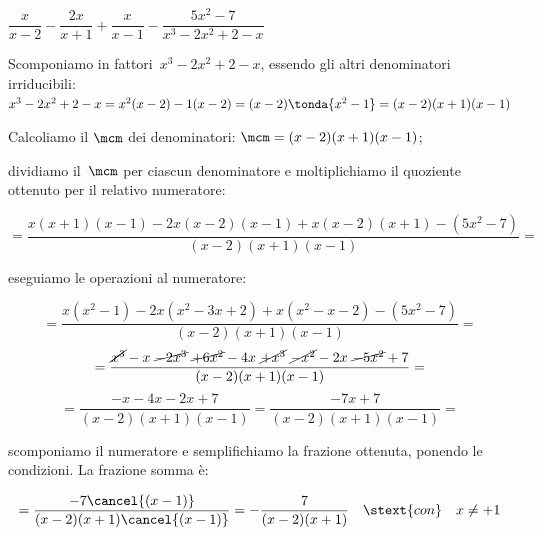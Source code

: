 
\begin{esempio}{}{}
\(\dfrac{x}{x-2}-\dfrac{2x}{x+1}+
\dfrac{x}{x-1}-\dfrac{5x^{2}-7}{x^{3}-2x^{2}+2-x}\)\\

\begin{enumeratea}
\item Scomponiamo in fattori~\(x^{3}-2x^{2}+2-x\), 
essendo gli altri denominatori irriducibili: 
\(x^{3}-2x^{2}+2-x=x^2(x-2)-1(x-2)=(x-2) \tonda{x^2-1} =
  (x-2)(x+1)(x-1)\)%

\item Calcoliamo il \(\mcm\) dei denominatori: 
\(\mcm=(x-2)(x+1)(x-1)\);

\item dividiamo il~\(\mcm\) per ciascun denominatore e moltiplichiamo il 
quoziente ottenuto per il relativo numeratore:

\vspace{-2em}
\[=\dfrac{x(x+1)(x-1)-2x(x-2)(x-1)+x(x-2)(x+1)-(5x^{2}-7)}
        {(x-2)(x+1)(x-1)}=\]
\item eseguiamo le operazioni al numeratore:

\vspace{-2em}
\[=\dfrac{x(x^2-1)-2x(x^2-3x+2)+x(x^2-x-2)-(5x^{2}-7)}{(x-2)(x+1)(x-1)} 
= \]
\[=\dfrac{\cancel{x^3}-x~\cancel{-2x^3}~\cancel{+6x^2}-4x~\cancel{+x^3}
        ~\cancel{-x^2}-2x~\cancel{-5x^2}+7}
        {(x-2)(x+1)(x-1)}=\]
\[=\dfrac{-x-4x-2x+7}{(x-2)(x+1)(x-1)}=\dfrac{-7x+7}{(x-2)(x+1)(x-1)}=\]
\item scomponiamo il numeratore e semplifichiamo la frazione ottenuta, 
ponendo le condizioni. La frazione somma è:

\vspace{-2em}
\[=\dfrac{-7\cancel{(x-1)}}{(x-2)(x+1)\cancel{(x-1)}}=
  -{\dfrac{7}{(x-2)(x+1)}} \quad  \stext{con} \quad x \neq +1\]
\end{enumeratea}
\end{esempio}

